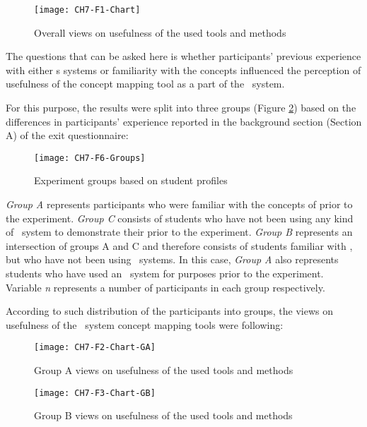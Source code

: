 \begin{figure}[htb]
\centering
\texttt{[image: CH7-F1-Chart]}
\caption{Overall views on usefulness of the used tools and methods}
\label{fig:overall}
\end{figure}

The questions that can be asked here is whether participants' previous
experience with either \ep s systems or familiarity with the \LLLs concepts
influenced the perception of usefulness of the concept mapping tool as a part of
the \ep~system.

For this purpose, the results were split into three groups (Figure
\ref{fig:groups}) based on the differences in participants' experience
reported in the background section (Section A) of the exit questionnaire:

\begin{figure}[htb]
\centering
\texttt{[image: CH7-F6-Groups]}
\caption{Experiment groups based on student profiles}
\label{fig:groups}
\end{figure}

\FloatBarrier

\textit{Group A} represents participants who were familiar with the concepts of
\LLLs prior to the experiment. \textit{Group C} consists of students who have
not been using any kind of \ep~system to demonstrate their \LLLs prior to the
experiment. \textit{Group B} represents an intersection of groups A and C and
therefore consists of students familiar with \LLLsn, but who have not been using
\ep~systems. In this case, \textit{Group A} also represents students who
have used an \ep~system for \LLLs purposes prior to the experiment. Variable
\textit{n} represents a number of participants in each group respectively.

According to such distribution of the participants into groups, the views on
usefulness of the \ep~system concept mapping tools were following:

\begin{figure}[htb]
\centering
\texttt{[image: CH7-F2-Chart-GA]}
\caption{Group A views on usefulness of the used tools and methods}
\label{fig:group1}
\end{figure}

\begin{figure}[htb]
\centering
\texttt{[image: CH7-F3-Chart-GB]}
\caption{Group B views on usefulness of the used tools and methods}
\label{fig:group2}
\end{figure}

